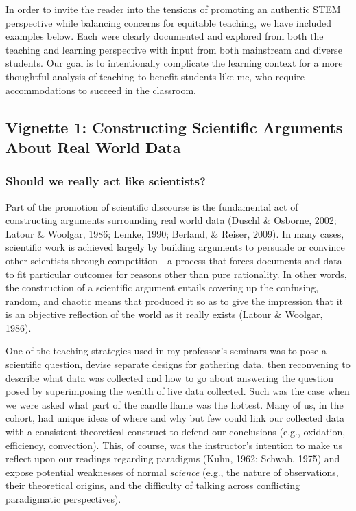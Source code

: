 \documentclass[11.5pt]{sig-alternate} %
\begin{document}
\begin{large}
In order to invite the reader into the tensions of promoting an authentic STEM perspective while balancing concerns for equitable teaching, we have included examples below.  Each were clearly documented and explored from both the teaching and learning perspective with input from both mainstream and diverse students.  Our goal is to intentionally complicate the learning context for a more thoughtful analysis of teaching to benefit students like me, who require accommodations to succeed in the classroom.

\subsection*{Vignette 1: Constructing Scientific Arguments About Real World Data}
 
\subsubsection*{Should we really act like scientists?}

Part of the promotion of scientific discourse is the fundamental act of constructing arguments surrounding real world data (Duschl \& Osborne, 2002; Latour \& Woolgar, 1986; Lemke, 1990; Berland, \& Reiser, 2009). In many cases, scientific work is achieved largely by building arguments to persuade or convince other scientists through competition—a process that forces documents and data to fit particular outcomes for reasons other than pure rationality. In other words, the construction of a scientific argument entails covering up the confusing, random, and chaotic means that produced it so as to give the impression that it is an objective reflection of the world as it really exists (Latour \& Woolgar, 1986). 

One of the teaching strategies used in my professor’s seminars was to pose a scientific question, devise separate designs for gathering data, then reconvening to describe what data was collected and how to go about answering the question posed by superimposing the wealth of live data collected.  Such was the case when we were asked what part of the candle flame was the hottest. Many of us, in the cohort, had unique ideas of where and why but few could link our collected data with a consistent theoretical construct to defend our conclusions (e.g., oxidation, efficiency, convection).  This, of course, was the instructor’s intention to make us reflect upon our readings regarding paradigms (Kuhn, 1962; Schwab, 1975) and expose potential weaknesses of normal \textit{science} (e.g., the nature of observations, their theoretical origins, and the difficulty of talking across conflicting paradigmatic perspectives).


\end{large}
\end{document}
